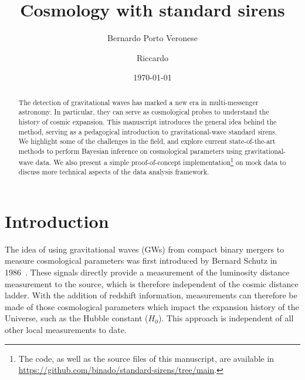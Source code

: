 \documentclass[%
preprint,
nofootinbib,
 amsmath,amssymb,
 aps,
]{revtex4-2}
\begin{document}

\title{Cosmology with standard sirens}

\author{Bernardo Porto Veronese}
\author{Riccardo}
%


\date{\today}%

\begin{abstract}
	The detection of gravitational waves has marked a new era in multi-messenger astronomy.
	In particular, they can serve as cosmological probes to understand the history of cosmic expansion.
	This manuscript introduces the general idea behind the method, serving as a pedagogical introduction to gravitational-wave standard sirens.
	We highlight some of the challenges in the field, and explore current
	state-of-the-art methods to perform Bayesian inference on cosmological parameters using gravitational-wave data.
	We also present a simple proof-of-concept implementation\footnote{The code, as well as the source files of this manuscript, are available in \url{https://github.com/binado/standard-sirens/tree/main}.}
	on mock data to discuss more technical aspects of the data analysis framework.
\end{abstract}

\maketitle


\section{\label{sec:introduction}Introduction} The idea of using gravitational waves (GWs) from compact binary mergers to measure
cosmological parameters was first introduced by Bernard Schutz in 1986~\cite{Schutz:1986gp}. These
signals directly provide a measurement of the luminosity distance measurement to the source, which
is therefore independent of the cosmic distance ladder. With the addition of redshift information,
measurements can therefore be made of those cosmological parameters which impact the expansion
history of the Universe, such as the Hubble constant ($H_0$). This approach is independent of all
other local measurements to date.
\end{document}

